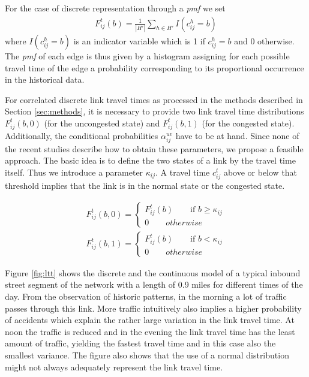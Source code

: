 For the case of discrete representation through a \textit{pmf} we set
\begin{gather}
F_{ij}^t(b) = \frac{1}{|H'|}\sum_{h\in H'} I(c_{ij}^h = b)
\end{gather}
where $I(c_{ij}^h = b)$ is an indicator variable which is 1 if $c_{ij}^h =
b$ and 0 otherwise. The \textit{pmf} of each edge is thus given by a histogram
assigning for each possible travel time of the edge a probability corresponding to its
proportional occurrence in the historical data. 

For correlated discrete link travel times as processed in the methods
described in Section \ref{sec:methods}, it is necessary to provide two link
travel time distributions $F_{ij}^t(b, 0)$ (for the uncongested state) and $F_{ij}^t(b, 1)$ (for the congested state).
Additionally, the conditional probabilities $\alpha^{uv}_{ij}$ have to be at
hand. Since none of the recent studies \cite{WalZil02,FanKalMoo05}
describe how to obtain these parameters, we propose a feasible
approach. The basic idea is to define the two states of a link by the travel
time itself. Thus we introduce a parameter $\kappa_{ij}$. A travel time
$c_{ij}^t$ above or below that threshold implies that the link is in the normal
state or the congested state.

\begin{gather}
	F_{ij}^t(b, 0) = \begin{cases}F_{ij}^t(b) \qquad \text{if } b \geq
	\kappa_{ij}\\
	0 \qquad otherwise
	\end{cases} \\
	F_{ij}^t(b, 1) = \begin{cases}F_{ij}^t(b) \qquad \text{if } b < \kappa_{ij}\\
	0 \qquad otherwise
	\end{cases}
\end{gather}

Figure \ref{fig:ltt} shows the discrete and the continuous model of a typical
inbound street segment of the network with a length of 0.9 miles for different
times of the day. From the observation of historic patterns, in the morning a lot of traffic passes through this link. More
traffic intuitively also implies a higher probability of accidents which explain
the rather large variation in the link travel time. At noon the traffic is
reduced and in the evening the link travel time has the least amount of traffic,
yielding the fastest travel time and in this case also the smallest variance.
The figure also shows that the use of a normal distribution might not always
adequately represent the link travel time.


